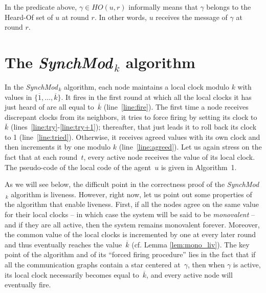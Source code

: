 \documentclass{article}
\newcommand{\cent}{\gamma}
\newcommand{\SM}{{\em SynchMod}$_{\,k}$ }
\begin{document}
In the predicate above, $\cent \in HO(u,r)$ informally means that $\cent$ belongs to the Heard-Of set of $u$ at round $r$. In other words, $u$ receives the message of $\cent$ at round $r$.

\section{The \SM algorithm}

In the \SM algorithm, each node  maintains a local clock modulo $k$ with values in $\{ \overline{1}, \dots,  \overline{k} \}$.
It fires in the first round at which all the local clocks it has just heard of  are all equal to~$\overline{k} $ (line~\ref{line:fire}).
The first time a node receives discrepant clocks from its neighbors, it tries to force firing  by setting its clock to  $\overline{k} $
	(lines~\ref{line:try}-\ref{line:try+1});
	thereafter, that  just leads it to roll back its clock to 1 (line~\ref{line:tried}).
Otherwise, it receives agreed values with its own clock and then increments it by one modulo $k$ (line~\ref{line:agreed}).
Let us again stress on the fact that at each round~$t$, every active node receives the value of its local clock.
The pseudo-code of the local code of the agent~$u$ is given in Algorithm~1.

As we will see below, the difficult point in the correctness proof of the \SM algorithm is liveness.
However, right now, let us point out some properties of the algorithm that enable liveness.
First, if all the nodes  agree on the same value for their local clocks 
	-- in which case the system will be said to be \emph{monovalent} -- and if they are all active, 
	then the system remains monovalent forever.
Moreover, the common value of the local clocks is incremented by one at every later round and thus eventually 
	reaches the value~$\overline{k} $ (cf. Lemma \ref{lem:mono_liv}).
The key point of the algorithm and of its ``forced firing procedure'' lies in the fact that if all the communication graphs  
	contain a star centered at~$\cent$, then when  $\cent$ is active, its local clock necessarily becomes equal 
	to~$\overline{k}$, and every active node will eventually fire. 

\end{document}
